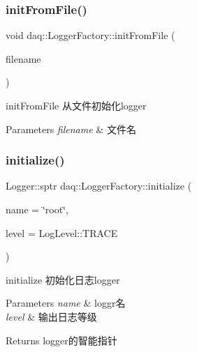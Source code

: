 \subsubsection{\texorpdfstring{init\+From\+File()}{initFromFile()}}
{\footnotesize\ttfamily void daq\+::\+Logger\+Factory\+::init\+From\+File (\begin{DoxyParamCaption}\item[{const std\+::string \&}]{filename }\end{DoxyParamCaption})}



init\+From\+File 从文件初始化logger 


\begin{DoxyParams}{Parameters}
{\em filename} & 文件名 \\
\hline
\end{DoxyParams}
\mbox{\label{classdaq_1_1LoggerFactory_ad417ef89981205a406dd4fa29e3b4c7a}} 
\subsubsection{\texorpdfstring{initialize()}{initialize()}}
{\footnotesize\ttfamily Logger\+::sptr daq\+::\+Logger\+Factory\+::initialize (\begin{DoxyParamCaption}\item[{const std\+::string \&}]{name = {\ttfamily \char`\"{}root\char`\"{}},  }\item[{const Log\+Level}]{level = {\ttfamily LogLevel\+:\+:TRACE} }\end{DoxyParamCaption})}



initialize 初始化日志logger 


\begin{DoxyParams}{Parameters}
{\em name} & loggr名 \\
\hline
{\em level} & 输出日志等级\\
\hline
\end{DoxyParams}
\begin{DoxyReturn}{Returns}
logger的智能指针 
\end{DoxyReturn}
\mbox{\label{classdaq_1_1LoggerFactory_ab8772fd3e644f8885a4024e0f0c70b49}} 
